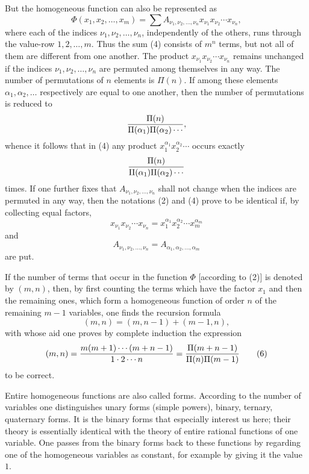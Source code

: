\documentclass[11pt]{article}
\begin{document}
But the homogeneous function can also be represented as
\begin{equation}
 \Phi(x_1,x_2,\ldots,x_m)=
 \sum A_{\nu_1,\nu_2,\ldots,\nu_n}x_{\nu_1}x_{\nu_2}\cdots x_{\nu_n},
\tag{4}
\end{equation}
where each of the indices $\nu_1,\nu_2,\ldots,\nu_n$, independently of the others, runs through the value-row $1,2,\ldots,m$. Thus the sum (4) consists of $m^n$ terms, but not all of them are different from one another. The product $x_{\nu_1}x_{\nu_2}\cdots x_{\nu_n}$ remains unchanged if the indices $\nu_1,\nu_2,\ldots,\nu_n$ are permuted among themselves in any way. The number of permutations of $n$ elements is $\Pi(n)$. If among these elements $\alpha_1,\alpha_2,\ldots$ respectively are equal to one another, then the number of permutations is reduced to
\[
 {\Pi(n)\over \Pi(\alpha_1)\Pi(\alpha_2)\cdots},
\]
whence it follows that in (4) any product $x_1^{\alpha_1}x_2^{\alpha_2}\cdots$ occurs exactly
\[
 {\Pi(n)\over \Pi(\alpha_1)\Pi(\alpha_2)\cdots}
\]
times. If one further fixes that $A_{\nu_1,\nu_2,\ldots,\nu_n}$ shall not change when the indices are permuted in any way, then the notations (2) and (4) prove to be identical if, by collecting equal factors,
\[
 x_{\nu_1}x_{\nu_2}\cdots x_{\nu_n}=x_1^{\alpha_1}x_2^{\alpha_2}\cdots x_m^{\alpha_m}
\]
and
\[
 A_{\nu_1,\nu_2,\ldots,\nu_n}=A_{\alpha_1,\alpha_2,\ldots,\alpha_m}
\]
are put.

If the number of terms that occur in the function $\Phi$ [according to (2)] is denoted by $(m,n)$, then, by first counting the terms which have the factor $x_1$ and then the remaining ones, which form a homogeneous function of order $n$ of the remaining $m-1$ variables, one finds the recursion formula
\begin{equation}
 (m,n)=(m,n-1)+(m-1,n),
\tag{5}
\end{equation}
with whose aid one proves by complete induction the expression
\begin{equation}
 (m,n)={m(m+1)\cdots(m+n-1)\over 1\cdot2\cdots n}
 ={ \Pi(m+n-1)\over \Pi(n)\Pi(m-1)}
\tag{6}
\end{equation}
to be correct.

Entire homogeneous functions are also called forms. According to the number of variables one distinguishes unary forms (simple powers), binary, ternary, quaternary forms. It is the binary forms that especially interest us here; their theory is essentially identical with the theory of entire rational functions of one variable. One passes from the binary forms back to these functions by regarding one of the homogeneous variables as constant, for example by giving it the value $1$.
\end{document}
